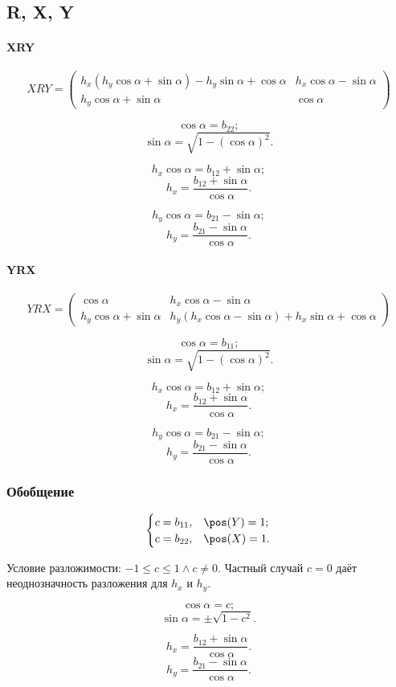 \subsection{R, X, Y}
\paragraph{XRY}

\[
XRY =
\begin{pmatrix}
	{h_x} \left( {h_y} \cos\alpha + \sin\alpha\right) - {h_y}\sin\alpha + \cos\alpha &
	{h_x} \cos\alpha - \sin\alpha\\
	{h_y} \cos\alpha + \sin\alpha & 
	\cos\alpha
\end{pmatrix}
\]

$$\cos\alpha = b_{22};$$
$$\sin\alpha = \sqrt{1- (\cos\alpha)^2}.$$

$${h_x} \cos\alpha = b_{12} + \sin\alpha;$$
$$h_x = \frac{b_{12} + \sin\alpha}{\cos\alpha}.$$

$${h_y} \cos\alpha = b_{21} - \sin\alpha;$$ 
$$h_y = \frac{b_{21} - \sin\alpha}{\cos\alpha}.$$


\paragraph{YRX}

\[
YRX = 
\begin{pmatrix}
	\cos\alpha & 
	{h_x} \cos\alpha - \sin\alpha\\
	{h_y} \cos\alpha + \sin\alpha & 
	{h_y} \left( {h_x}\cos\alpha - \sin\alpha\right) + {h_x}\sin\alpha + \cos\alpha
\end{pmatrix}
\]

$$\cos\alpha = b_{11};$$
$$\sin\alpha = \sqrt{1- (\cos\alpha)^2}.$$

$${h_x} \cos\alpha = b_{12} + \sin\alpha;$$
$$h_x = \frac{b_{12} + \sin\alpha}{\cos\alpha}.$$

$${h_y} \cos\alpha = b_{21} - \sin\alpha;$$ 
$$h_y = \frac{b_{21} - \sin\alpha}{\cos\alpha}.$$


\subsubsection{Обобщение}

$$\begin{cases}
	c = b_{11}, & \pos(Y) = 1;\\
	c = b_{22}, & \pos(X) = 1.
\end{cases}$$

Условие разложимости: $-1 \le c \le 1 \wedge c \ne 0$.
Частный случай $c = 0$ даёт неоднозначность разложения для $h_x$ и $h_y$.

$$\cos\alpha = c;$$
$$\sin\alpha = \pm \sqrt{1 - c^2}.$$

$$h_x = \frac{b_{12} + \sin\alpha}{\cos\alpha}.$$
$$h_y = \frac{b_{21} - \sin\alpha}{\cos\alpha}.$$
